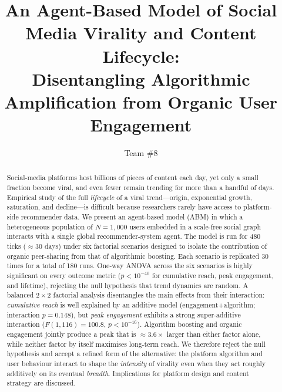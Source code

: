 \documentclass[sigconf, nonacm]{acmart}
\begin{document}
\title[ABM of Social Media Virality]{An Agent-Based Model of Social Media Virality and Content Lifecycle:\\Disentangling Algorithmic Amplification from Organic User Engagement}

\author{Team \#8}

\renewcommand{\shortauthors}{Team \#8}

\begin{abstract}
Social-media platforms host billions of pieces of content each day, yet only
a small fraction become viral, and even fewer remain trending for more than a
handful of days.  Empirical study of the full \emph{lifecycle} of a viral
trend---origin, exponential growth, saturation, and decline---is difficult
because researchers rarely have access to platform-side recommender data.
We present an agent-based model (ABM) in which a heterogeneous population
of $N{=}1{,}000$ users embedded in a scale-free social graph interacts with
a single global recommender-system agent.  The model is run for 480 ticks
($\approx{}$30 days) under six factorial scenarios designed to isolate the
contribution of organic peer-sharing from that of algorithmic boosting.
Each scenario is replicated 30 times for a total of 180 runs.  One-way
ANOVA across the six scenarios is highly significant on every outcome
metric ($p<10^{-40}$ for cumulative reach, peak engagement, and lifetime),
rejecting the null hypothesis that trend dynamics are random.  A balanced
$2{\times}2$ factorial analysis disentangles the main effects from their
interaction: \emph{cumulative reach} is well explained by an additive model
(engagement$+$algorithm; interaction $p{=}0.148$), but \emph{peak
engagement} exhibits a strong super-additive interaction
($F(1,116){=}100.8$, $p<10^{-16}$).  Algorithm boosting and organic
engagement jointly produce a peak that is $\approx 3.6\times$ larger than
either factor alone, while neither factor by itself maximises long-term
reach.  We therefore reject the null hypothesis and accept a refined form
of the alternative: the platform algorithm and user behaviour interact to
shape the \emph{intensity} of virality even when they act roughly
additively on its eventual \emph{breadth}.  Implications for platform
design and content strategy are discussed.
\end{abstract}

\end{document}
